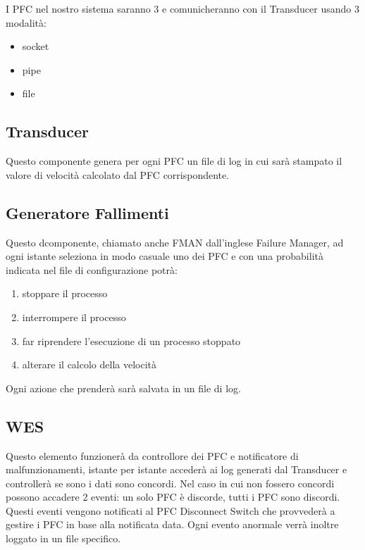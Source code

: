 \documentclass{article}
\begin{document}
\begin{flushleft}
I PFC nel nostro sistema saranno 3 e comunicheranno con il Transducer usando 3 modalità:

\begin{itemize}
    \item socket
    \item pipe
    \item file
\end{itemize}

\subsection{Transducer}

Questo componente genera per ogni PFC un file di log in cui sarà stampato il valore di velocità calcolato dal PFC corrispondente.

\subsection{Generatore Fallimenti}

Questo dcomponente, chiamato anche FMAN dall'inglese Failure Manager, ad ogni istante seleziona in modo casuale uno dei PFC e con una probabilità indicata nel file di configurazione potrà:

\begin{enumerate}
    \item stoppare il processo
    \item interrompere il processo
    \item far riprendere l'esecuzione di un processo stoppato
    \item alterare il calcolo della velocità
\end{enumerate}

Ogni azione che prenderà sarà salvata in un file di log.

\subsection{WES}

Questo elemento funzionerà da controllore dei PFC e notificatore di malfunzionamenti, istante per istante accederà ai log generati dal Transducer e controllerà se sono i dati sono concordi. Nel caso in cui non fossero concordi possono accadere 2 eventi: un solo PFC è discorde, tutti i PFC sono discordi. Questi eventi vengono notificati al PFC Disconnect Switch che provvederà a gestire i PFC in base alla notificata data. Ogni evento anormale verrà inoltre loggato in un file specifico.  


\end{flushleft}
\end{document}
